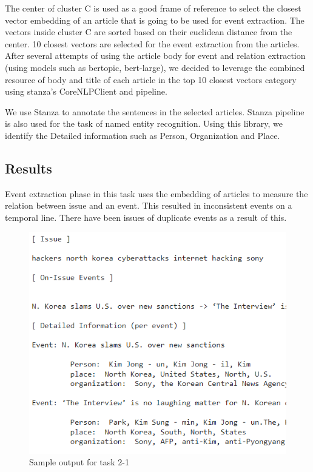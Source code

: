 \documentclass[sigconf,authorversion,nonacm]{acmart}
\begin{document}
The center of cluster C is used as a good frame of reference to select the closest vector embedding of an article that is going to be used for event extraction. The vectors inside cluster C are sorted based on their euclidean distance from the center. 10 closest vectors are selected for the event extraction from the articles. After several attempts of using the article body for event and relation extraction (using models such as bertopic, bert-large), we decided to leverage the combined resource of body and title of each article in the top 10 closest vectors category using stanza’s CoreNLPClient and pipeline. 

We use Stanza to annotate the sentences in the selected articles. Stanza pipeline is also used for the task of named entity recognition. Using this library, we identify the Detailed information such as Person, Organization and Place.

\subsection{Results}
Event extraction phase in this task uses the embedding of articles to measure the relation between issue and an event. This resulted in inconsistent events on a temporal line. There have been issues of duplicate events as a result of this.

\begin{figure}[ht]
    \includegraphics[width=0.8\linewidth]{img/image5.png}
    \caption{Sample output for task 2-1}
\end{figure}
\end{document}
